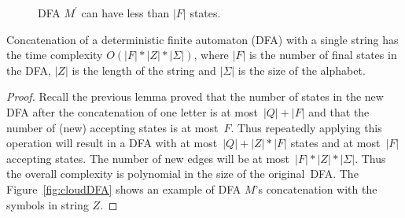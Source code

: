\documentclass{lmcs} %
\theoremstyle{plain}\newtheorem{satz}[thm]{Satz} %
\newcommand\irregularcircle[2]{%
  \pgfextra {\pgfmathsetmacro\len{(#1)+rand*(#2)}}
  +(0:\len pt)
  \foreach \a in {10,20,...,350}{
    \pgfextra {\pgfmathsetmacro\len{(#1)+rand*(#2)}}
    -- +(\a:\len pt)
  } -- cycle
}
\begin{document}
\begin{appendices}
\begin{figure}
{
}
\caption{DFA $M_{}^{\prime}$ can have less than $|F|$ states.}
\label{fig:sameLetterTransition}
\end{figure}

\begin{lem}{\label{DFAConcatString}}
Concatenation of a deterministic finite automaton (DFA) with a single
string has the time complexity $O(|F| \ast |Z| \ast
|\Sigma|)$, where $|F|$ is the number of final states in the DFA, $|Z|$
is the length of the string and $|\Sigma|$ is the size of
the alphabet.
\end{lem}
\begin{proof}
Recall the previous lemma proved that the number of states 
in the new DFA after
the concatenation of one letter 
is at most~$|Q| + |F|$ and that the number of 
(new) accepting states is at most~$F$. Thus repeatedly
applying this operation will result in a DFA with
at most~$|Q| + |Z| \ast |F|$ states and at most~$|F|$ accepting states.
The number of new edges will be at most~$|F| \ast |Z| \ast
|\Sigma|$. Thus the overall complexity is
polynomial in the size of the original~DFA. The Figure~\ref{fig:cloudDFA} shows an example of DFA $M$'s concatenation with the symbols in string $Z$. 
\end{proof}

\begin{figure}
\end{figure}
\end{appendices}
\end{document}
